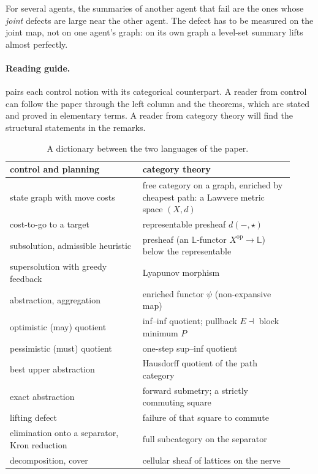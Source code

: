 \documentclass[11pt]{article}
\theoremstyle{definition}
\theoremstyle{remark}
\newcommand{\Lq}{\mathbb{L}}           %
\newcommand{\dd}{d}
\newcommand{\tgt}{\star}
\begin{document}
For several agents, the summaries of another agent that fail are the ones whose
\emph{joint} defects are large near the other agent. The defect has to be measured
on the joint map, not on one agent's graph: on its own graph a level-set summary
lifts almost perfectly.

\paragraph{Reading guide.}
 pairs each control notion with its categorical counterpart.
A reader from control can follow the paper through the left column and the
theorems, which are stated and proved in elementary terms. A reader from category
theory will find the structural statements in the remarks.

\begin{table}[t]
\centering
\small
\begin{tabular}{p{0.43\linewidth}p{0.49\linewidth}}
\toprule
control and planning & category theory \\
\midrule
state graph with move costs & free category on a graph, enriched by cheapest path: a Lawvere metric space $(X,\dd)$ \\
cost-to-go to a target & representable presheaf $\dd(-,\tgt)$ \\
subsolution, admissible heuristic & presheaf (an $\Lq$-functor $X^{\mathrm{op}} \to \Lq$) below the representable \\
supersolution with greedy feedback & Lyapunov morphism~\cite{ames2025clt1} \\
abstraction, aggregation & enriched functor $\psi$ (non-expansive map) \\
optimistic (may) quotient & inf--inf quotient; pullback $E \dashv$ block minimum $P$ \\
pessimistic (must) quotient & one-step sup--inf quotient \\
best upper abstraction & Hausdorff quotient of the path category \\
exact abstraction & forward submetry; a strictly commuting square \\
lifting defect & failure of that square to commute \\
elimination onto a separator, Kron reduction & full subcategory on the separator \\
decomposition, cover & cellular sheaf of lattices on the nerve \\
\bottomrule
\end{tabular}
\caption{A dictionary between the two languages of the paper.}
\label{tab:dictionary}
\end{table}
\end{document}
